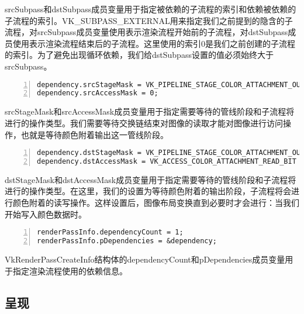 \documentclass{ctexart}
\begin{document}
srcSubpass和dstSubpass成员变量用于指定被依赖的子流程的索引和依赖被依赖的子流程的索引。VK\_SUBPASS\_EXTERNAL用来指定我们之前提到的隐含的子流程，对srcSubpass成员变量使用表示渲染流程开始前的子流程，对dstSubpass成员使用表示渲染流程结束后的子流程。这里使用的索引0是我们之前创建的子流程的索引。为了避免出现循环依赖，我们给dstSubpass设置的值必须始终大于srcSubpass。

\begin{lstlisting}[language={[ANSI]C},keywordstyle=\color{blue!70},commentstyle=\color{red!50!green!50!blue!50},frame=shadowbox, rulesepcolor=\color{red!20!green!20!blue!20},basicstyle=\small,numbers=left, numberstyle=\tiny,breaklines=true]
dependency.srcStageMask = VK_PIPELINE_STAGE_COLOR_ATTACHMENT_OUTPUT_BIT;
dependency.srcAccessMask = 0;
\end{lstlisting}

srcStageMask和srcAccessMask成员变量用于指定需要等待的管线阶段和子流程将进行的操作类型。我们需要等待交换链结束对图像的读取才能对图像进行访问操作，也就是等待颜色附着输出这一管线阶段。

\begin{lstlisting}[language={[ANSI]C},keywordstyle=\color{blue!70},commentstyle=\color{red!50!green!50!blue!50},frame=shadowbox, rulesepcolor=\color{red!20!green!20!blue!20},basicstyle=\small,numbers=left, numberstyle=\tiny,breaklines=true]
dependency.dstStageMask = VK_PIPELINE_STAGE_COLOR_ATTACHMENT_OUTPUT_BIT;
dependency.dstAccessMask = VK_ACCESS_COLOR_ATTACHMENT_READ_BIT | VK_ACCESS_COLOR_ATTACHMENT_WRITE_BIT;
\end{lstlisting}

dstStageMask和dstAccessMask成员变量用于指定需要等待的管线阶段和子流程将进行的操作类型。在这里，我们的设置为等待颜色附着的输出阶段，子流程将会进行颜色附着的读写操作。这样设置后，图像布局变换直到必要时才会进行：当我们开始写入颜色数据时。

\begin{lstlisting}[language={[ANSI]C},keywordstyle=\color{blue!70},commentstyle=\color{red!50!green!50!blue!50},frame=shadowbox, rulesepcolor=\color{red!20!green!20!blue!20},basicstyle=\small,numbers=left, numberstyle=\tiny,breaklines=true]
renderPassInfo.dependencyCount = 1;
renderPassInfo.pDependencies = &dependency;
\end{lstlisting}

VkRenderPassCreateInfo结构体的dependencyCount和pDependencies成员变量用于指定渲染流程使用的依赖信息。

\subsection{呈现}
\end{document}
